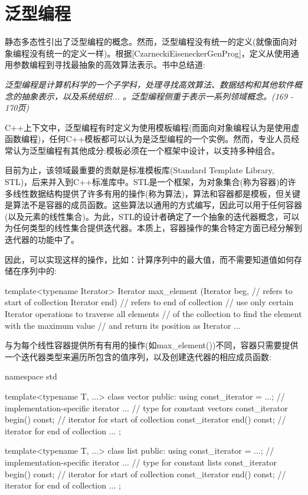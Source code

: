 \section{泛型编程}
静态多态性引出了泛型编程的概念。然而，泛型编程没有统一的定义(就像面向对象编程没有统一的定义一样)。根据[CzarneckiEiseneckerGenProg]，定义从使用通用参数编程到寻找最抽象的高效算法表示。书中总结道:

\textit{泛型编程是计算机科学的一个子学科，处理寻找高效算法、数据结构和其他软件概念的抽象表示，以及系统组织... 。泛型编程侧重于表示一系列领域概念。(169 - 170页)}

C++上下文中，泛型编程有时定义为使用模板编程(而面向对象编程认为是使用虚函数编程)，任何C++模板都可以认为是泛型编程的一个实例。然而，专业人员经常认为泛型编程有其他成分:模板必须在一个框架中设计，以支持多种组合。

目前为止，该领域最重要的贡献是标准模板库(Standard Template Library, STL)，后来并入到C++标准库中。STL是一个框架，为对象集合(称为容器)的许多线性数据结构提供了许多有用的操作(称为算法)，算法和容器都是模板，但关键是算法不是容器的成员函数。这些算法以通用的方式编写，因此可以用于任何容器(以及元素的线性集合)。为此，STL的设计者确定了一个抽象的迭代器概念，可以为任何类型的线性集合提供迭代器。本质上，容器操作的集合特定方面已经分解到迭代器的功能中了。

因此，可以实现这样的操作，比如：计算序列中的最大值，而不需要知道值如何存储在序列中的:

\begin{cpp}
template<typename Iterator>
Iterator max_element (Iterator beg, // refers to start of collection
					  Iterator end) // refers to end of collection
{
	// use only certain Iterator operations to traverse all elements
	// of the collection to find the element with the maximum value
	// and return its position as Iterator
	...
}
\end{cpp}

与为每个线性容器提供所有有用的操作(如max\_element())不同，容器只需要提供一个迭代器类型来遍历所包含的值序列，以及创建迭代器的相应成员函数:

\begin{cpp}
namespace std {
	template<typename T, ...>
	class vector {
		public:
		using const_iterator = ...; // implementation-specific iterator
		... // type for constant vectors
		const_iterator begin() const; // iterator for start of collection
		const_iterator end() const; // iterator for end of collection
		...
	};

	template<typename T, ...>
	class list {
		public:
		using const_iterator = ...; // implementation-specific iterator
		... // type for constant lists
		const_iterator begin() const; // iterator for start of collection
		const_iterator end() const; // iterator for end of collection
		...
	};
}
\end{cpp}

